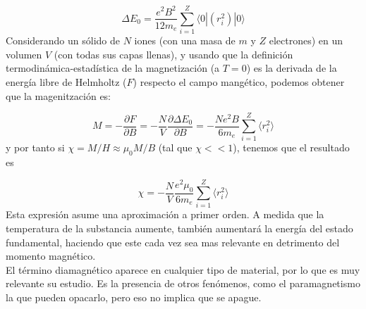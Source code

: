 \documentclass[12pt,a4paper]{book}
\numberwithin{equation}{section}
\numberwithin{figure}{section}
\newcommand{\parciales}[2]{\frac{\partial #1}{\partial #2}}
\begin{document}
\begin{equation}
\Delta E_0 = \frac{e^2 B^2}{12 m_e} \sum_{i=1}^Z \langle 0 | (r_i^2) | 0 \rangle 
\end{equation}
Considerando un sólido de $N$ iones (con una masa de $m$ y $Z$ electrones) en un volumen $V$ (con todas sus capas llenas), y usando que la definición termodinámica-estadística de la magnetización (a $T=0$) es la derivada de la energía libre de Helmholtz ($F$) respecto el campo mangético, podemos obtener que la magenitzación es:

\begin{equation}
M = - \parciales{F}{B} = - \frac{N}{V} \parciales{\Delta E_0}{B} = - \frac{N e^2 B}{6 m_e} \sum_{i=1}^Z \langle r_i^2 \rangle
\end{equation}
y por tanto si $\chi = M / H \approx \mu_0 M / B$ (tal que $\chi << 1$), tenemos que el resultado es

\begin{equation}
\chi = - \frac{N}{V} \frac{ e^2 \mu_0}{6 m_e} \sum_{i=1}^Z \langle r_i^2 \rangle \label{Ec:02-03-004}
\end{equation}
Esta expresión asume una aproximación a primer orden. A medida que la temperatura de la substancia aumente, también aumentará la energía del estado fundamental, haciendo que este cada vez sea mas relevante en detrimento del momento magnético.   \\

El término diamagnético aparece en cualquier tipo de material, por lo que es muy relevante su estudio. Es la presencia de otros fenómenos, como el paramagnetismo la que pueden opacarlo, pero eso no implica que se apague.


\end{document}
